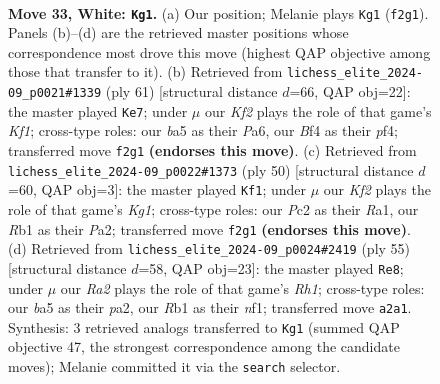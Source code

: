 \documentclass[11pt]{article}
\begin{document}
\clearpage

\begin{figure}[p]\centering
\begin{subfigure}{0.46\textwidth}\centering
\resizebox{\linewidth}{!}{%
\newchessgame
\chessboard[
  setfen={r5nr/p4k1p/8/b1p5/5B2/P2B3P/RPP2KP1/1R6 w - - 0 33},
  showmover=false,
  pgfstyle=straightmove, color=movearrow, markmove={f2-g1}
]}
\caption{}
\end{subfigure}\hfill
\begin{subfigure}{0.46\textwidth}\centering
\resizebox{\linewidth}{!}{%
\newchessgame
\chessboard[
  setfen={r4k2/1p3ppp/p1b1p3/8/2P2P2/8/PP1RBKPP/8 b - - 2 31},
  showmover=false,
  pgfstyle=straightmove, color=movearrow, markmove={f8-e7}
]}
\caption{}
\end{subfigure}
\\[4pt]
\begin{subfigure}{0.46\textwidth}\centering
\resizebox{\linewidth}{!}{%
\newchessgame
\chessboard[
  setfen={2b1k1r1/p1p1p3/p7/4N3/8/2BP4/PPP2PnP/R5K1 w - - 3 26},
  showmover=false,
  pgfstyle=straightmove, color=movearrow, markmove={g1-f1}
]}
\caption{}
\end{subfigure}\hfill
\begin{subfigure}{0.46\textwidth}\centering
\resizebox{\linewidth}{!}{%
\newchessgame
\chessboard[
  setfen={2k4r/p1p4p/3b2p1/8/2pP4/8/PPK2R1P/5N2 b - - 0 28},
  showmover=false,
  pgfstyle=straightmove, color=movearrow, markmove={h8-e8}
]}
\caption{}
\end{subfigure}
\caption{\textbf{Move 33, White: \texttt{Kg1}.} (a) Our position; Melanie plays \texttt{Kg1} (\texttt{f2g1}). Panels (b)--(d) are the retrieved master positions whose correspondence most drove this move (highest QAP objective among those that transfer to it). (b) Retrieved from \texttt{lichess\_elite\_2024-09\_p0021\#1339} (ply 61) [structural distance $d$=66, QAP obj=22]: the master played \texttt{Ke7}; under $\mu$ our \emph{Kf2} plays the role of that game's \emph{Kf1}; cross-type roles: our \emph{b}a5 as their \emph{P}a6, our \emph{B}f4 as their \emph{p}f4; transferred move \texttt{f2g1} \textbf{(endorses this move)}. (c) Retrieved from \texttt{lichess\_elite\_2024-09\_p0022\#1373} (ply 50) [structural distance $d$=60, QAP obj=3]: the master played \texttt{Kf1}; under $\mu$ our \emph{Kf2} plays the role of that game's \emph{Kg1}; cross-type roles: our \emph{P}c2 as their \emph{R}a1, our \emph{R}b1 as their \emph{P}a2; transferred move \texttt{f2g1} \textbf{(endorses this move)}. (d) Retrieved from \texttt{lichess\_elite\_2024-09\_p0024\#2419} (ply 55) [structural distance $d$=58, QAP obj=23]: the master played \texttt{Re8}; under $\mu$ our \emph{Ra2} plays the role of that game's \emph{Rh1}; cross-type roles: our \emph{b}a5 as their \emph{p}a2, our \emph{R}b1 as their \emph{n}f1; transferred move \texttt{a2a1}. Synthesis: 3 retrieved analogs transferred to \texttt{Kg1} (summed QAP objective 47, the strongest correspondence among the candidate moves); Melanie committed it via the \texttt{search} selector.}
\label{fig:thought-m64}
\end{figure}
\end{document}
